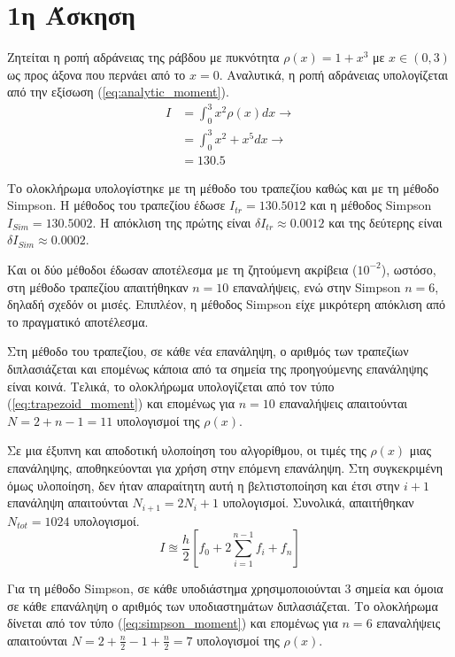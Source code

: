 \documentclass[assignment4.tex]{subfiles}
\begin{document}
\section*{1η Άσκηση}
Ζητείται η ροπή αδράνειας της ράβδου με πυκνότητα $\rho(x) = 1+x^3$ με $x\in(0,3)$ ως προς άξονα που περνάει από το $x=0$. Αναλυτικά, η ροπή αδράνειας υπολογίζεται από την εξίσωση (\ref{eq:analytic_moment}).
\begin{equation}
\begin{split}
I &= \int_{0}^{3} x^2\rho(x) dx \rightarrow \\
&= \int_{0}^{3} x^2 + x^5 dx \rightarrow \\
&= 130.5
\end{split}
\label{eq:analytic_moment}
\end{equation}

Το ολοκλήρωμα υπολογίστηκε με τη μέθοδο του τραπεζίου καθώς και με τη μέθοδο \textlatin{Simpson}. Η μέθοδος του τραπεζίου έδωσε $I_{tr}=130.5012$ και η μέθοδος \textlatin{Simpson} $I_{Sim}=130.5002$. Η απόκλιση της πρώτης είναι $\delta I_{tr}\approx0.0012$ και της δεύτερης είναι $\delta I_{Sim}\approx0.0002$. 

Και οι δύο μέθοδοι έδωσαν αποτέλεσμα με τη ζητούμενη ακρίβεια ($10^{-2}$), ωστόσο, στη μέθοδο τραπεζίου απαιτήθηκαν $n=10$ επαναλήψεις, ενώ στην \textlatin{Simpson} $n=6$, δηλαδή σχεδόν οι μισές. Επιπλέον, η μέθοδος \textlatin{Simpson} είχε μικρότερη απόκλιση από το πραγματικό αποτέλεσμα.

Στη μέθοδο του τραπεζίου, σε κάθε νέα επανάληψη, ο αριθμός των τραπεζίων διπλασιάζεται και επομένως κάποια από τα σημεία της προηγούμενης επανάληψης είναι κοινά. Τελικά, το ολοκλήρωμα υπολογίζεται από τον τύπο (\ref{eq:trapezoid_moment}) και επομένως για $n=10$ επαναλήψεις απαιτούνται $N=2+n-1=11$ υπολογισμοί της $\rho(x)$. 

Σε μια έξυπνη και αποδοτική υλοποίηση του αλγορίθμου, οι τιμές της $\rho(x)$ μιας επανάληψης, αποθηκεύονται για χρήση στην επόμενη επανάληψη. Στη συγκεκριμένη όμως υλοποίηση, δεν ήταν απαραίτητη αυτή η βελτιστοποίηση και έτσι στην $i+1$ επανάληψη απαιτούνται $Ν_{i+1} = 2Ν_i + 1$ υπολογισμοί. Συνολικά, απαιτήθηκαν $Ν_{tot}=1024$ υπολογισμοί.
\begin{equation}
I \approxeq \frac{h}{2}\left[ f_0 + 2\sum_{i=1}^{n-1}f_i + f_n \right]
\label{eq:trapezoid_moment}
\end{equation}

Για τη μέθοδο \textlatin{Simpson}, σε κάθε υποδιάστημα χρησιμοποιούνται 3 σημεία και όμοια σε κάθε επανάληψη ο αριθμός των υποδιαστημάτων διπλασιάζεται. Το ολοκλήρωμα δίνεται από τον τύπο (\ref{eq:simpson_moment}) και επομένως για $n=6$ επαναλήψεις απαιτούνται $N=2+\frac{n}{2}-1+\frac{n}{2}=7$ υπολογισμοί της $\rho(x)$.
\end{document}
